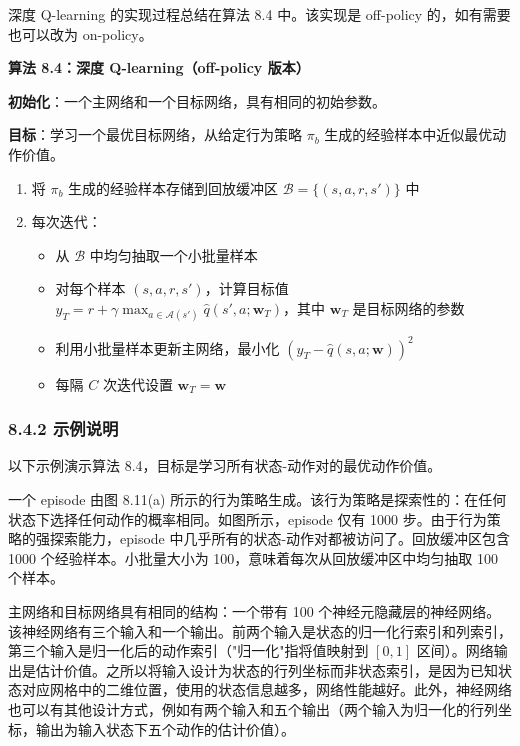 \documentclass[UTF8]{article}
\begin{document}
深度 Q-learning 的实现过程总结在算法 8.4 中。该实现是 off-policy 的，如有需要也可以改为 on-policy。

\begin{remarkbox}
\textbf{算法 8.4：深度 Q-learning（off-policy 版本）}

\textbf{初始化}：一个主网络和一个目标网络，具有相同的初始参数。

\textbf{目标}：学习一个最优目标网络，从给定行为策略 $\pi_b$ 生成的经验样本中近似最优动作价值。

\begin{enumerate}
    \item 将 $\pi_b$ 生成的经验样本存储到回放缓冲区 $\mathcal{B} = \{(s, a, r, s')\}$ 中
    \item 每次迭代：
    \begin{itemize}
        \item 从 $\mathcal{B}$ 中均匀抽取一个小批量样本
        \item 对每个样本 $(s, a, r, s')$，计算目标值 $y_T = r + \gamma \max_{a \in \mathcal{A}(s')} \hat{q}(s', a; \boldsymbol{w}_T)$，其中 $\boldsymbol{w}_T$ 是目标网络的参数
        \item 利用小批量样本更新主网络，最小化 $(y_T - \hat{q}(s, a; \boldsymbol{w}))^2$
        \item 每隔 $C$ 次迭代设置 $\boldsymbol{w}_T = \boldsymbol{w}$
    \end{itemize}
\end{enumerate}
\end{remarkbox}

\subsubsection*{8.4.2 示例说明}

以下示例演示算法 8.4，目标是学习所有状态-动作对的最优动作价值。

一个 episode 由图 8.11(a) 所示的行为策略生成。该行为策略是探索性的：在任何状态下选择任何动作的概率相同。如图所示，episode 仅有 1000 步。由于行为策略的强探索能力，episode 中几乎所有的状态-动作对都被访问了。回放缓冲区包含 1000 个经验样本。小批量大小为 100，意味着每次从回放缓冲区中均匀抽取 100 个样本。

主网络和目标网络具有相同的结构：一个带有 100 个神经元隐藏层的神经网络。该神经网络有三个输入和一个输出。前两个输入是状态的归一化行索引和列索引，第三个输入是归一化后的动作索引（"归一化"指将值映射到 $[0, 1]$ 区间）。网络输出是估计价值。之所以将输入设计为状态的行列坐标而非状态索引，是因为已知状态对应网格中的二维位置，使用的状态信息越多，网络性能越好。此外，神经网络也可以有其他设计方式，例如有两个输入和五个输出（两个输入为归一化的行列坐标，输出为输入状态下五个动作的估计价值）。
\end{document}
